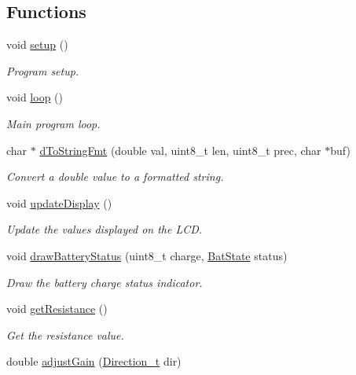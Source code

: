 \subsection*{Functions}
\begin{DoxyCompactItemize}
\item 
void \hyperlink{_milli_ohm_meter_8ino_a4fc01d736fe50cf5b977f755b675f11d}{setup} ()
\begin{DoxyCompactList}\small\item\em Program setup. \end{DoxyCompactList}\item 
void \hyperlink{_milli_ohm_meter_8ino_afe461d27b9c48d5921c00d521181f12f}{loop} ()
\begin{DoxyCompactList}\small\item\em Main program loop. \end{DoxyCompactList}\item 
char $\ast$ \hyperlink{_milli_ohm_meter_8ino_a68f1779f400e8f8219dfe38e1667aa94}{d\-To\-String\-Fmt} (double val, uint8\-\_\-t len, uint8\-\_\-t prec, char $\ast$buf)
\begin{DoxyCompactList}\small\item\em Convert a double value to a formatted string. \end{DoxyCompactList}\item 
void \hyperlink{_milli_ohm_meter_8ino_ab7eb3c8c2e8604801ee00f11d3af8c3f}{update\-Display} ()
\begin{DoxyCompactList}\small\item\em Update the values displayed on the L\-C\-D. \end{DoxyCompactList}\item 
void \hyperlink{_milli_ohm_meter_8ino_a2a74727714a096c3367809fb212e1b3b}{draw\-Battery\-Status} (uint8\-\_\-t charge, \hyperlink{_milli_ohm_meter_8h_ac8776b96d749ba6bdfb057c808e61d31}{Bat\-State} status)
\begin{DoxyCompactList}\small\item\em Draw the battery charge status indicator. \end{DoxyCompactList}\item 
void \hyperlink{_milli_ohm_meter_8ino_aca5c6e5b1c80c93de5420e1fae096c56}{get\-Resistance} ()
\begin{DoxyCompactList}\small\item\em Get the resistance value. \end{DoxyCompactList}\item 
double \hyperlink{_milli_ohm_meter_8ino_a7752c1a0a14c86fe69172c521aedd0c6}{adjust\-Gain} (\hyperlink{_milli_ohm_meter_8h_a2e9ec086ba61b35cfc2439306cdfdd70}{Direction\-\_\-t} dir)

\end{DoxyCompactItemize}
